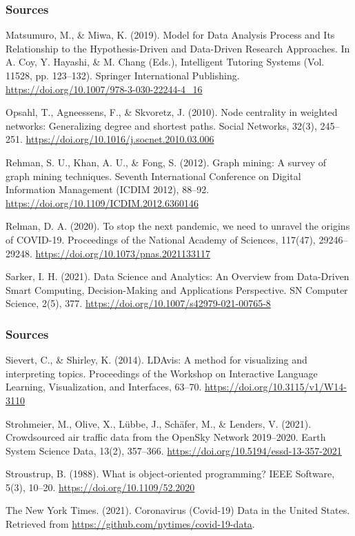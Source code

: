 \documentclass{beamer}
\begin{document}
\begin{frame}
\frametitle{Sources}

Matsumuro, M., \& Miwa, K. (2019). Model for Data Analysis Process and Its Relationship to the Hypothesis-Driven and Data-Driven Research Approaches. In A. Coy, Y. Hayashi, \& M. Chang (Eds.), Intelligent Tutoring Systems (Vol. 11528, pp. 123–132). Springer International Publishing. \url{https://doi.org/10.1007/978-3-030-22244-4_16}

\vspace{5px}

Opsahl, T., Agneessens, F., \& Skvoretz, J. (2010). Node centrality in weighted networks: Generalizing degree and shortest paths. Social Networks, 32(3), 245–251. \url{https://doi.org/10.1016/j.socnet.2010.03.006}

\vspace{5px}

Rehman, S. U., Khan, A. U., \& Fong, S. (2012). Graph mining: A survey of graph mining techniques. Seventh International Conference on Digital Information Management (ICDIM 2012), 88–92. \url{https://doi.org/10.1109/ICDIM.2012.6360146}

\vspace{5px}

Relman, D. A. (2020). To stop the next pandemic, we need to unravel the origins of COVID-19. Proceedings of the National Academy of Sciences, 117(47), 29246–29248. \url{https://doi.org/10.1073/pnas.2021133117}

\vspace{5px}

Sarker, I. H. (2021). Data Science and Analytics: An Overview from Data-Driven Smart Computing, Decision-Making and Applications Perspective. SN Computer Science, 2(5), 377. \url{https://doi.org/10.1007/s42979-021-00765-8}

\end{frame}


\begin{frame}
\frametitle{Sources}


Sievert, C., \& Shirley, K. (2014). LDAvis: A method for visualizing and interpreting topics. Proceedings of the Workshop on Interactive Language Learning, Visualization, and Interfaces, 63–70. \url{https://doi.org/10.3115/v1/W14-3110}

\vspace{5px}

Strohmeier, M., Olive, X., Lübbe, J., Schäfer, M., \& Lenders, V. (2021). Crowdsourced air traffic data from the OpenSky Network 2019–2020. Earth System Science Data, 13(2), 357–366. \url{https://doi.org/10.5194/essd-13-357-2021}

\vspace{5px}

Stroustrup, B. (1988). What is object-oriented programming? IEEE Software, 5(3), 10–20. \url{https://doi.org/10.1109/52.2020}

\vspace{5px}

The New York Times. (2021). Coronavirus (Covid-19) Data in the United States. Retrieved from \url{https://github.com/nytimes/covid-19-data}.

\end{frame}
\end{document}
